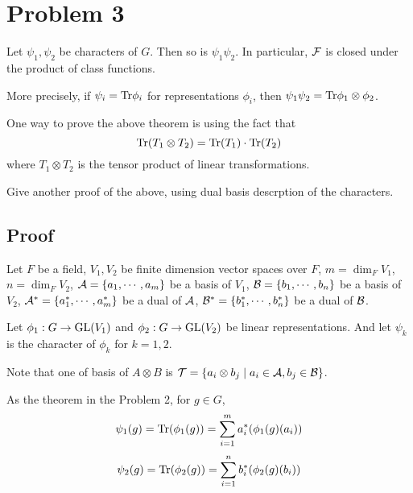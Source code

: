 \section*{Problem 3}

\begin{theorem}
  Let \(\psi_1, \psi_2\) be characters of \(G\).
  Then so is \(\psi_1 \psi_2\).
  In particular, \(\mathcal{F}\) is closed under the product of class functions.

  More precisely, if \(\psi_i = \textnormal{Tr} \phi_i\) for representations \(\phi_i\),
  then \(\psi_1 \psi_2 = \textnormal{Tr} \phi_1 \otimes \phi_2\).
\end{theorem}

One way to prove the above theorem is using the fact that
\[\textnormal{Tr}(T_1 \otimes T_2) = \textnormal{Tr}(T_1) \cdot \textnormal{Tr}(T_2)\]
where \(T_1 \otimes T_2\) is the tensor product of linear transformations.

Give another proof of the above,
using dual basis descrption of the characters.

\subsection*{Proof}

Let \(F\) be a field,
\(V_1, V_2\) be finite dimension vector spaces over \(F\),
\(m = \dim_F V_1\),
\(n = \dim_F V_2\),
\(\mathcal{A} = \{a_1, \cdots, a_m\}\) be a basis of \(V_1\),
\(\mathcal{B} = \{b_1, \cdots, b_n\}\) be a basis of \(V_2\),
\(\mathcal{A}^* = \{a^*_1, \cdots, a^*_m\}\) be a dual of \(\mathcal{A}\),
\(\mathcal{B}^* = \{b^*_1, \cdots, b^*_n\}\) be a dual of \(\mathcal{B}\).

Let \(\phi_1: G \to \textnormal{GL}(V_1)\) and \(\phi_2: G \to \textnormal{GL}(V_2)\) be linear representations.
And let \(\psi_k\) is the character of \(\phi_k\) for \(k = 1, 2\).

Note that
one of basis of \(A \otimes B\)
is
\(\mathcal{T} = \{a_i \otimes b_j \mid a_i \in \mathcal{A}, b_j \in \mathcal{B}\}\).

As the theorem in the Problem 2, for \(g \in G\),
\[\psi_1(g) = \textnormal{Tr}(\phi_1(g)) = \sum_{i=1}^m a_i^*(\phi_1(g)(a_i))\]
\[\psi_2(g) = \textnormal{Tr}(\phi_2(g)) = \sum_{i=1}^n b_i^*(\phi_2(g)(b_i))\]

